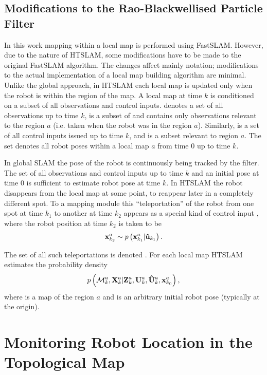 \subsection{Modifications to the Rao-Blackwellised Particle Filter}


In this work mapping within a local map is performed using
FastSLAM. However, due to the nature of HTSLAM, some modifications have
to be made to the original FastSLAM algorithm. The changes affect
mainly notation; modifications to the actual implementation of a local
map building algorithm are minimal.  Unlike the global approach, in
HTSLAM each local map is updated only when the robot is within the
region of the map. A local map at time $k$ is conditioned on a subset
of all observations and control inputs.  denotes a set of
all observations up to time $k$,  is a subset of 
and contains only observations relevant to the region $a$ (i.e. taken
when the robot was in the region $a$). Similarly,  is a set
of all control inputs issued up to time $k$, and  is a
subset relevant to region $a$. The set  denotes all robot
poses within a local map $a$ from time $0$ up to time $k$.

In global SLAM the pose of the robot is continuously being tracked by
the filter. The set of all observations and control inputs up to time
$k$ and an initial pose at time 0 is sufficient to estimate robot pose
at time $k$. In HTSLAM the robot disappears from the local map at some
point, to reappear later in a completely different spot. To a mapping
module this ``teleportation'' of the robot from one spot at time $k_1$
to another at time $k_2$ appears as a special kind of control input
, where the robot position at time $k_2$ is taken to be 
$$
\x{k_2}{}{a} \sample{}{} \prob{\x{k_1}{}{a} | \Teleport{k_1}}.
$$

The set of all such teleportations is denoted . For
each local map HTSLAM estimates the probability density
$$
\prob{\map{k}{}{a},\Xall{k}{}{a} | 
\Zall{k}{a},\Uall{k}{a},\TeleportAll{k}{a},\x{k_0}{}{a}},
$$
where  is a map of the region $a$ and  is an
arbitrary initial robot pose (typically at the origin).


\section{Monitoring Robot Location in the Topological Map}
\label{sec:topological_pose}

